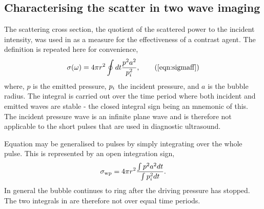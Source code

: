 \subsection{Characterising the scatter in two wave imaging}\label{sec:comp:optimum}

The scattering cross section, the quotient  of the scattered power to the incident intensity,  was used in  %
as a measure for the effectiveness of a contrast agent.
%
%
The definition is repeated here for convenience,
\begin{align}
  \sigma(\omega) = 4\pi r^2 \oint dt \frac{ p^2  a^2}{\incp^2},\tag{\ref{eqn:sigmaff}}
\end{align}
where, $p$ is the emitted pressure, $p_i$  the incident  pressure, and $a$ is the bubble radius.
The integral is carried out over the
time period where both incident and emitted waves are stable - the closed integral sign being an mnemonic of this.
The incident pressure wave is an infinite plane wave and is therefore not applicable to the short pulses that are used in diagnostic ultrasound.

Equation  may be generalised to pulses by simply integrating over the whole pulse.
This is represented by an  open integration sign,
\begin{align}
  \sigma_\textrm{wp} = 4\pi r^2\frac{ \int p^2 a^2dt}{ \int p_i^2dt} \label{eqn:sigmaPulse}.
\end{align} 
In general the bubble continues to ring after the driving pressure has stopped.
The two integrals in  are therefore not  over equal time periods.



